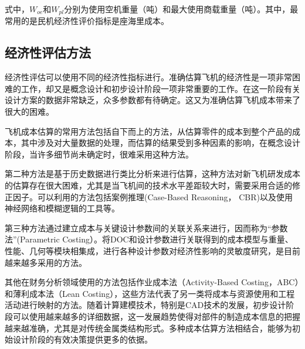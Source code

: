 式中，$W_{oe}$和$W_{pl}$分别为使用空机重量（吨）和最大使用商载重量（吨）。其中，最常用的是民机经济性评价指标是座海里成本。

\subsection{经济性评估方法}
经济性评估可以使用不同的经济性指标进行。准确估算飞机的经济性是一项非常困难的工作，却又是概念设计和初步设计阶段一项非常重要的工作。在这一阶段有关设计方案的数据非常缺乏，众多参数都有待确定。这又为准确估算飞机成本带来了很大的困难。

飞机成本估算的常用方法包括自下而上的方法，从估算零件的成本到整个产品的成本，其中涉及对大量数据的处理，而估算的结果受到多种因素的影响，在概念设计阶段，当许多细节尚未确定时，很难采用这种方法。

第二种方法是基于历史数据进行类比分析来进行估算，这种方法对新飞机研发成本的估算存在很大困难，尤其是当飞机间的技术水平差距较大时，需要采用合适的修正因子。可以利用的方法包括案例推理(Case-Based Reasoning， CBR)以及使用神经网络和模糊逻辑的工具等。

第三种方法通过建立成本与关键设计参数间的关联关系来进行，因而称为“参数法”(Parametric Costing）。将DOC和设计参数进行关联得到的成本模型与重量、性能、几何等模块相集成，进行各种设计参数对经济性影响的灵敏度研究，是目前越来越多采用的方法。

其他在财务分析领域使用的方法包括作业成本法（Activity-Based Costing，ABC）和薄利成本法（Lean Costing），这些方法代表了另一类将成本与资源使用和工程活动进行映射的方法。随着计算建模技术，特别是CAD技术的发展，初步设计阶段可以使用越来越多的详细数据，这一发展趋势使得对部件的制造成本信息的把握越来越准确，尤其是对传统金属类结构形式。多种成本估算方法相结合，能够为初始设计阶段的有效决策提供更多的依据。

